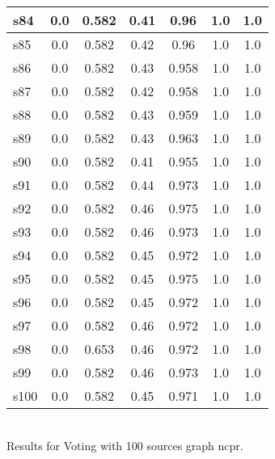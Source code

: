 \documentclass{article}
\begin{document}
\begin{tabular}{|l|c|c|c|c|c|c|}
s84 &0.0 & 0.582 & 0.41 & 0.96 & 1.0 & 1.0\\
\hline
s85 &0.0 & 0.582 & 0.42 & 0.96 & 1.0 & 1.0\\
\hline
s86 &0.0 & 0.582 & 0.43 & 0.958 & 1.0 & 1.0\\
\hline
s87 &0.0 & 0.582 & 0.42 & 0.958 & 1.0 & 1.0\\
\hline
s88 &0.0 & 0.582 & 0.43 & 0.959 & 1.0 & 1.0\\
\hline
s89 &0.0 & 0.582 & 0.43 & 0.963 & 1.0 & 1.0\\
\hline
s90 &0.0 & 0.582 & 0.41 & 0.955 & 1.0 & 1.0\\
\hline
s91 &0.0 & 0.582 & 0.44 & 0.973 & 1.0 & 1.0\\
\hline
s92 &0.0 & 0.582 & 0.46 & 0.975 & 1.0 & 1.0\\
\hline
s93 &0.0 & 0.582 & 0.46 & 0.973 & 1.0 & 1.0\\
\hline
s94 &0.0 & 0.582 & 0.45 & 0.972 & 1.0 & 1.0\\
\hline
s95 &0.0 & 0.582 & 0.45 & 0.975 & 1.0 & 1.0\\
\hline
s96 &0.0 & 0.582 & 0.45 & 0.972 & 1.0 & 1.0\\
\hline
s97 &0.0 & 0.582 & 0.46 & 0.972 & 1.0 & 1.0\\
\hline
s98 &0.0 & 0.653 & 0.46 & 0.972 & 1.0 & 1.0\\
\hline
s99 &0.0 & 0.582 & 0.46 & 0.973 & 1.0 & 1.0\\
\hline
s100 &0.0 & 0.582 & 0.45 & 0.971 & 1.0 & 1.0\\
\hline
\end{tabular}\\

\noindent Results for Voting with 100 sources graph ncpr.
\end{document}
